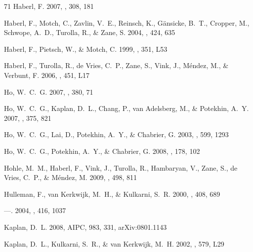 \documentclass[iop]{emulateapj}
\begin{document}
\begin{thebibliography}{71}
{Haberl}, F. 2007, \apss, 308, 181

{Haberl}, F., {Motch}, C., {Zavlin}, V.~E., {Reinsch}, K., {G{\" a}nsicke},
  B.~T., {Cropper}, M., {Schwope}, A.~D., {Turolla}, R., \& {Zane}, S. 2004,
  \aap, 424, 635

{Haberl}, F., {Pietsch}, W., \& {Motch}, C. 1999, \aap, 351, L53

{Haberl}, F., {Turolla}, R., {de Vries}, C.~P., {Zane}, S., {Vink}, J.,
  {M{\'e}ndez}, M., \& {Verbunt}, F. 2006, \aap, 451, L17

{Ho}, W.~C.~G. 2007, \mnras, 380, 71

{Ho}, W.~C.~G., {Kaplan}, D.~L., {Chang}, P., {van Adelsberg}, M., \&
  {Potekhin}, A.~Y. 2007, \mnras, 375, 821

{Ho}, W.~C.~G., {Lai}, D., {Potekhin}, A.~Y., \& {Chabrier}, G. 2003, \apj,
  599, 1293

{Ho}, W.~C.~G., {Potekhin}, A.~Y., \& {Chabrier}, G. 2008, \apjs, 178, 102

{Hohle}, M.~M., {Haberl}, F., {Vink}, J., {Turolla}, R., {Hambaryan}, V.,
  {Zane}, S., {de Vries}, C.~P., \& {M{\'e}ndez}, M. 2009, \aap, 498, 811

{Hulleman}, F., {van Kerkwijk}, M.~H., \& {Kulkarni}, S.~R. 2000, \nat, 408,
  689

---. 2004, \aap, 416, 1037

{Kaplan}, D.~L. 2008, AIPC, 983, 331, arXiv:0801.1143

{Kaplan}, D.~L., {Kulkarni}, S.~R., \& {van Kerkwijk}, M.~H.
  2002{}, \apjl, 579, L29


\end{thebibliography}
\end{document}
